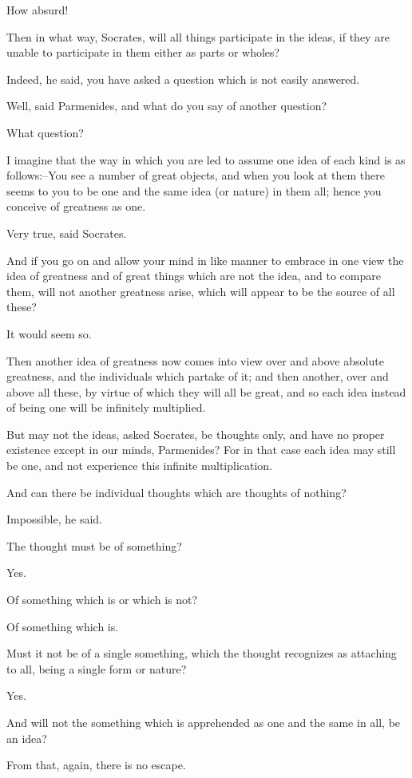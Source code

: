 How absurd!

Then in what way, Socrates, will all things participate in the ideas, if
they are unable to participate in them either as parts or wholes?

Indeed, he said, you have asked a question which is not easily answered.

Well, said Parmenides, and what do you say of another question?

What question?

I imagine that the way in which you are led to assume one idea of each
kind is as follows:--You see a number of great objects, and when you
look at them there seems to you to be one and the same idea (or nature)
in them all; hence you conceive of greatness as one.

Very true, said Socrates.

And if you go on and allow your mind in like manner to embrace in one
view the idea of greatness and of great things which are not the idea,
and to compare them, will not another greatness arise, which will appear
to be the source of all these?

It would seem so.

Then another idea of greatness now comes into view over and above
absolute greatness, and the individuals which partake of it; and then
another, over and above all these, by virtue of which they will all
be great, and so each idea instead of being one will be infinitely
multiplied.

But may not the ideas, asked Socrates, be thoughts only, and have no
proper existence except in our minds, Parmenides? For in that case each
idea may still be one, and not experience this infinite multiplication.

And can there be individual thoughts which are thoughts of nothing?

Impossible, he said.

The thought must be of something?

Yes.

Of something which is or which is not?

Of something which is.

Must it not be of a single something, which the thought recognizes as
attaching to all, being a single form or nature?

Yes.

And will not the something which is apprehended as one and the same in
all, be an idea?

From that, again, there is no escape.

